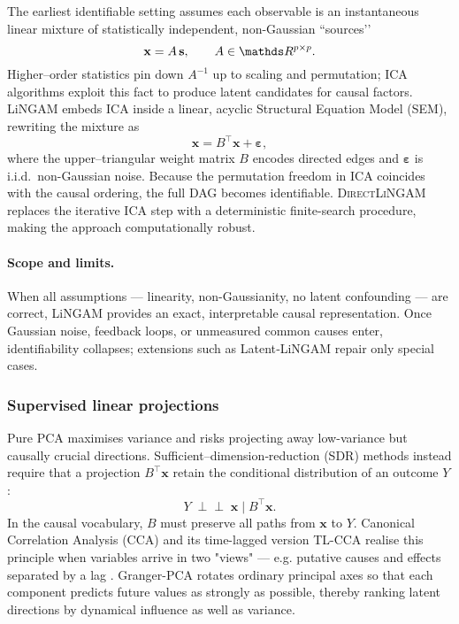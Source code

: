 \documentclass[14pt]{extarticle}
\begin{document}
	The earliest identifiable setting assumes each observable is an instantaneous linear mixture of statistically independent, non-Gaussian “sources’’  
	\[
	\mathbf{x} = A \,\mathbf{s}, \qquad A \in \dR^{p\times p}.
	\]
	Higher–order statistics pin down $A^{-1}$ up to scaling and permutation; ICA algorithms exploit this fact to produce latent candidates for causal factors.  
	LiNGAM \citep{Shimizu2006} embeds ICA inside a linear, acyclic Structural Equation Model (SEM), rewriting the mixture as  
	\[
	\mathbf{x}=B^{\top}\mathbf{x}+\boldsymbol\varepsilon,
	\]
	where the upper–triangular weight matrix $B$ encodes directed edges and $\boldsymbol\varepsilon$ is i.i.d.\ non-Gaussian noise.  
	Because the permutation freedom in ICA coincides with the causal ordering, the full DAG becomes identifiable.  
	\textsc{DirectLiNGAM} \citep{Shimizu2011} replaces the iterative ICA step with a deterministic finite-search procedure, making the approach computationally robust.
	
	\paragraph{Scope and limits.}
	When all assumptions — linearity, non-Gaussianity, no latent confounding — are correct, LiNGAM provides an exact, interpretable causal representation.  
	Once Gaussian noise, feedback loops, or unmeasured common causes enter, identifiability collapses; extensions such as Latent‐LiNGAM repair only special cases.  
	
	\subsubsection*{Supervised linear projections}
	
	Pure PCA maximises variance and risks projecting away low-variance but causally crucial directions.  
	Sufficient–dimension‐reduction (SDR) methods instead require that a projection $B^{\top}\mathbf{x}$ retain the conditional distribution of an outcome $Y$:
	\[
	Y\;\perp\!\!\!\perp\;\mathbf{x}\;\bigl|\;B^{\top}\mathbf{x}.
	\]
	In the causal vocabulary, $B$ must preserve all paths from $\mathbf{x}$ to $Y$.  
	Canonical Correlation Analysis (CCA) and its time-lagged version TL-CCA realise this principle when variables arrive in two "views" — e.g. putative causes and effects separated by a lag \citep{Moneta2023}.  
	Granger-PCA rotates ordinary principal axes so that each component predicts future values as strongly as possible, thereby ranking latent directions by dynamical influence as well as variance.
	
\end{document}
